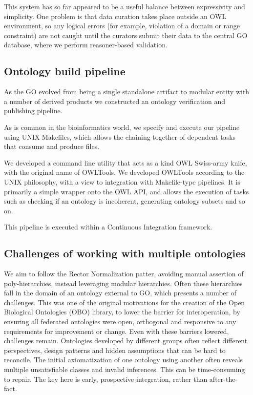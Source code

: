 \documentclass{llncs}
\begin{document}
This system has so far appeared to be a useful balance between
expressivity and simplicity. One problem is that data curation takes
place outside an OWL environment, so any logical errors (for example,
violation of a domain or range constraint) are not caught until the
curators submit their data to the central GO database, where we
perform reasoner-based validation.


\subsection{Ontology build pipeline}

As the GO evolved from being a single standalone artifact to modular
entity with a number of derived products we constructed an ontology
verification and publishing pipeline.

As is common in the bioinformatics world, we specify and execute our
pipeline using UNIX Makefiles, which allows the chaining together of
dependent tasks that consume and produce files.

We developed a command line utility that acts as a kind OWL Swiss-army
knife, with the original name of OWLTools. We developed
OWLTools according to the UNIX philosophy, with a view to integration
with Makefile-type pipelines. It is primarily a simple wrapper onto
the OWL API, and allows the execution of tasks such as checking if an
ontology is incoherent, generating ontology subsets and so on.

This pipeline is executed within a Continuous Integration
framework\cite{Mungall2012a}.

\subsection{Challenges of working with multiple ontologies}

We aim to follow the Rector Normalization patter, avoiding manual
assertion of poly-hierarchies, instead leveraging modular
hierarchies. Often these hierarchies fall in the domain of an ontology
external to GO, which presents a number of challenges. This was one of
the original motivations for the creation of the Open Biological
Ontologies (OBO) library, to lower the barrier for interoperation, by
ensuring all federated ontologies were open, orthogonal and responsive
to any requirements for improvement or change. Even with these
barriers lowered, challenges remain. Ontologies developed by different
groups often reflect different perspectives, design patterns and
hidden assumptions that can be hard to reconcile. The initial
axiomatization of one ontology using another often reveals multiple
unsatisfiable classes and invalid inferences. This can be
time-consuming to repair. The key here is early, prospective
integration, rather than after-the-fact.
\end{document}
